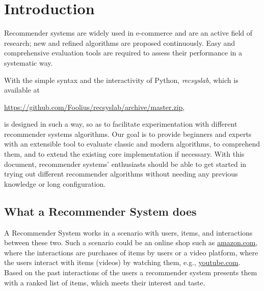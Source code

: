 \chapter{Introduction}
Recommender systems are widely used in e-commerce and are an active field of research; new and refined algorithms are proposed continuously. Easy and comprehensive evaluation tools are required to assess their performance in a systematic way.  

With the simple syntax and the interactivity
of Python, \textit{recsyslab}, which is available at\\
\vspace{1.5mm}
\centerline{\url{https://github.com/Foolius/recsyslab/archive/master.zip},}
is designed in such a way, so as to facilitate experimentation with different recommender systems
algorithms. Our goal is to provide beginners and experts with an extensible tool to evaluate classic and modern algorithms, to comprehend them, and to extend the existing core implementation if necessary. With this document, recommender systems' enthusiasts should be able to get started in trying out different recommender algorithms
without needing any previous knowledge or long configuration.


\section{What a Recommender System does}
A Recommender System works in a scenario with users, items, and interactions
between these two. Such a scenario could be an online shop such as \url{amazon.com},
where the interactions are purchases of items by users or a video
platform, where the users interact with items (videos) by watching
them, e.g., \url{youtube.com}. Based on the past interactions of the users
a recommender system presents them with a ranked list of items, which meets their interest and taste.

